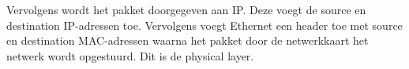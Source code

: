 Vervolgens wordt het pakket doorgegeven aan IP.
Deze voegt de source en destination IP-adressen toe.
Vervolgens voegt Ethernet een header toe met source en destination MAC-adressen waarna het pakket door de netwerkkaart het netwerk wordt opgestuurd.
Dit is de physical layer.


%

